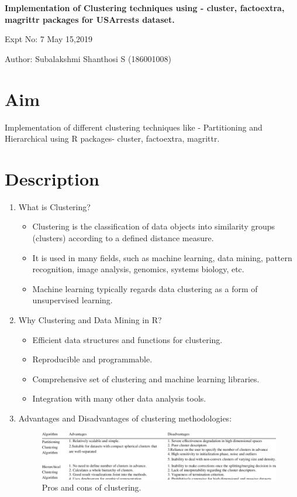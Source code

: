 \documentclass[a4paper,10pt]{article}
\begin{document}
\setcounter{secnumdepth}{-1} 
\begin{center}
\textbf{\LARGE  Implementation of Clustering techniques using - cluster, factoextra, magrittr packages for USArrests dataset.}
\end{center}

\raggedright Expt No: 7 \hfill \raggedleft May 15,2019 \\ 

\raggedright Author: Subalakshmi Shanthosi S (186001008) \par 

\noindent\makebox[\linewidth]{\rule{\textwidth}{1pt}} 

\section{Aim}
Implementation of different clustering techniques like - Partitioning and Hierarchical using R packages-	cluster, factoextra, magrittr.

\section{Description}
\begin{enumerate}
	\item What is Clustering?
	\begin{itemize}
		\item Clustering is the classification of data objects into similarity groups (clusters) according to a defined distance measure.
		\item It is used in many fields, such as machine learning, data mining, pattern recognition, image analysis, genomics, systems biology, etc.	 
		\item Machine learning typically regards data clustering as a form of unsupervised learning.
	\end{itemize}
 \item {Why Clustering and Data Mining in R?} 
	    \begin{itemize}
	    	\item Efficient data structures and functions for clustering.
	    	\item Reproducible and programmable.
	    	\item Comprehensive set of clustering and machine learning libraries.
	    	\item Integration with many other data analysis tools.	
	    \end{itemize}
    \item Advantages and Disadvantages of clustering methodologies:
    \begin{figure}[h]
    	\includegraphics[scale=0.60,center]{Expt8OP/advDisadvClustering.png}
    	\caption{Pros and cons of clustering.}
    	\label{fig:1}
    \end{figure}
\end{enumerate}
\end{document}
